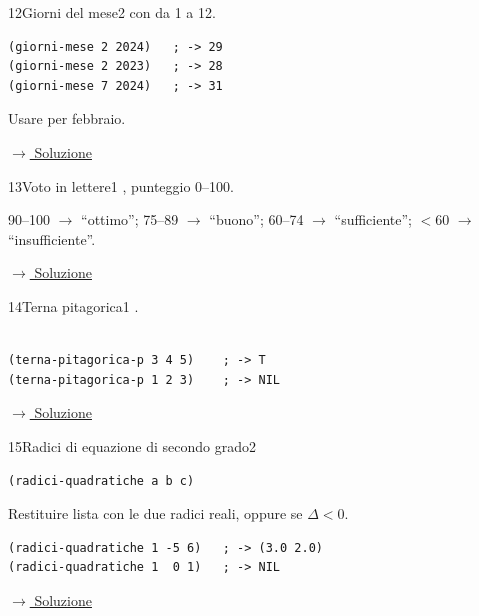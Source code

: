 \label{ex:12}
\begin{stdbox}{12}{Giorni del mese}{2}
  con  da 1 a 12.
\nopagebreak
\begin{lstlisting}
(giorni-mese 2 2024)   ; -> 29
(giorni-mese 2 2023)   ; -> 28
(giorni-mese 7 2024)   ; -> 31
\end{lstlisting}
Usare  per febbraio.


\small\color{black!55}\hyperref[sol:12]{$\rightarrow$ Soluzione}\normalsize\color{black}
\end{stdbox}

\label{ex:13}
\begin{colbox}{13}{Voto in lettere}{1}
 , punteggio 0--100.

90--100 $\to$ ``ottimo''; 75--89 $\to$ ``buono'';
60--74 $\to$ ``sufficiente''; $<60$ $\to$ ``insufficiente''.



\small\color{black!55}\hyperref[sol:13]{$\rightarrow$ Soluzione}\normalsize\color{black}
\end{colbox}

\label{ex:14}
\begin{colbox}{14}{Terna pitagorica}{1}
 .\\\\
\nopagebreak
\begin{lstlisting}
(terna-pitagorica-p 3 4 5)    ; -> T
(terna-pitagorica-p 1 2 3)    ; -> NIL
\end{lstlisting}


\small\color{black!55}\hyperref[sol:14]{$\rightarrow$ Soluzione}\normalsize\color{black}
\end{colbox}

\label{ex:15}
\begin{essbox}{15}{Radici di equazione di secondo grado}{2}
\nopagebreak
\begin{lstlisting}
(radici-quadratiche a b c)
\end{lstlisting}
Restituire lista con le due radici reali, oppure  se $\Delta < 0$.
\begin{lstlisting}
(radici-quadratiche 1 -5 6)   ; -> (3.0 2.0)
(radici-quadratiche 1  0 1)   ; -> NIL
\end{lstlisting}


\small\color{black!55}\hyperref[sol:15]{$\rightarrow$ Soluzione}\normalsize\color{black}
\end{essbox}

